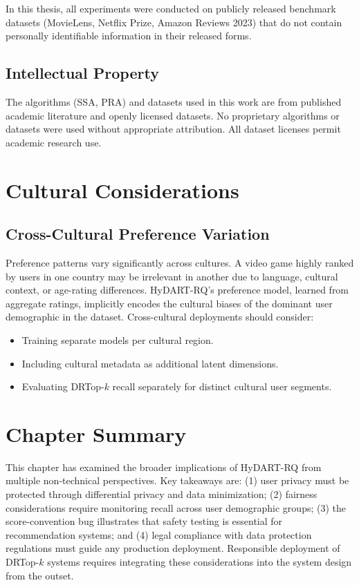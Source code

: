 In this thesis, all experiments were conducted on publicly released benchmark datasets (MovieLens, Netflix Prize, Amazon Reviews 2023) that do not contain personally identifiable information in their released forms.

\subsection{Intellectual Property}

The algorithms (SSA, PRA) and datasets used in this work are from published academic literature and openly licensed datasets. No proprietary algorithms or datasets were used without appropriate attribution. All dataset licenses permit academic research use.

\section{Cultural Considerations}

\subsection{Cross-Cultural Preference Variation}

Preference patterns vary significantly across cultures. A video game highly ranked by users in one country may be irrelevant in another due to language, cultural context, or age-rating differences. HyDART-RQ's preference model, learned from aggregate ratings, implicitly encodes the cultural biases of the dominant user demographic in the dataset. Cross-cultural deployments should consider:
\begin{itemize}
  \item Training separate models per cultural region.
  \item Including cultural metadata as additional latent dimensions.
  \item Evaluating DRTop-$k$ recall separately for distinct cultural user segments.
\end{itemize}

\section{Chapter Summary}

This chapter has examined the broader implications of HyDART-RQ from multiple non-technical perspectives. Key takeaways are: (1) user privacy must be protected through differential privacy and data minimization; (2) fairness considerations require monitoring recall across user demographic groups; (3) the score-convention bug illustrates that safety testing is essential for recommendation systems; and (4) legal compliance with data protection regulations must guide any production deployment. Responsible deployment of DRTop-$k$ systems requires integrating these considerations into the system design from the outset.
